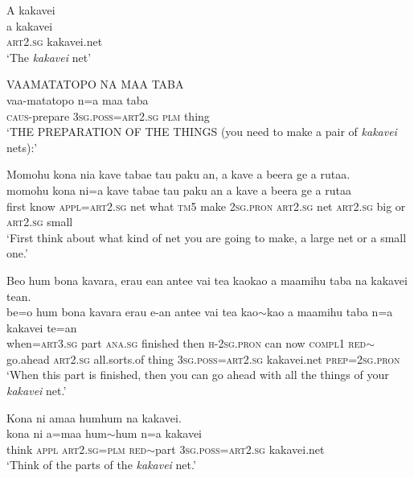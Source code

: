 \ea\label{ex:text22-1}
A kakavei\\
\gll a	kakavei\\
     \textsc{art}2.\textsc{sg}	kakavei.net\\
\glt `The \textit{kakavei} net'
\z

\ea\label{ex:text22-2}
VAAMATATOPO NA MAA TABA\\
\gll vaa-matatopo	n=a	maa	taba\\
     \textsc{caus}-prepare	3\textsc{sg}.\textsc{poss}=\textsc{art}2.\textsc{sg}	\textsc{plm}	thing\\
\glt `THE PREPARATION OF THE THINGS (you need to make a pair of \textit{kakavei} nets):'
\z

\ea\label{ex:text22-3}
Momohu kona nia kave tabae tau paku an, a kave a beera ge a rutaa.\\
\gll momohu	kona	ni=a	kave	tabae	tau	paku	an	a	kave	a	beera	ge	a	rutaa\\
     first	know	\textsc{appl}=\textsc{art}2.\textsc{sg}	net	what	\textsc{tm}5	make	2\textsc{sg}.\textsc{pron}	\textsc{art}2.\textsc{sg}	net	\textsc{art}2.\textsc{sg}	big	or	\textsc{art}2.\textsc{sg}	small\\
\glt `First think about what kind of net you are going to make, a large net or a small one.'
\z

\ea\label{ex:text22-4}
Beo hum bona kavara, erau ean antee vai tea kaokao a maamihu taba na kakavei tean.\\
\gll be=o	hum	bona	kavara	erau	e-an	antee	vai	tea	kao{$\sim$}kao	a	maamihu	taba	n=a	kakavei	te=an\\
     when=\textsc{art}3.\textsc{sg}	part	\textsc{ana}.\textsc{sg}	finished	then	\textsc{h}-2\textsc{sg}.\textsc{pron}	can	now	\textsc{compl}1	\textsc{red}{$\sim$}go.ahead	\textsc{art}2.\textsc{sg}	all.sorts.of	thing	3\textsc{sg}.\textsc{poss}=\textsc{art}2.\textsc{sg}	kakavei.net	\textsc{prep}=2\textsc{sg}.\textsc{pron}\\
\glt `When this part is finished, then you can go ahead with all the things of your \textit{kakavei} net.'
\z

\ea\label{ex:text22-5}
Kona ni amaa humhum na kakavei.\\
\gll kona	ni	a=maa	hum{$\sim$}hum	n=a	kakavei\\
     think	\textsc{appl}	\textsc{art}2.\textsc{sg}=\textsc{plm}	\textsc{red}{$\sim$}part	3\textsc{sg}.\textsc{poss}=\textsc{art}2.\textsc{sg}	kakavei.net\\
\glt `Think of the parts of the \textit{kakavei} net.'
\z

